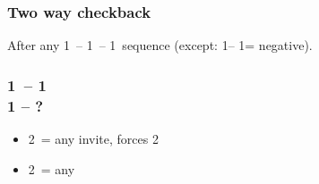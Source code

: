 \documentclass[12pt, a4paper]{article}
\begin{document}
\subsubsection*{Two way checkback}

After any 1\ -- 1\ -- 1\ sequence (except:
1\clubs -- 1\diams = negative).

\subsubsection*{1\ -- 1 \\ 1 -- ?}
\begin{itemize}
    \item 2\clubs\ = any invite, forces 2\diams
    \item 2\diams\ = any \gf
\end{itemize}

\end{document}
